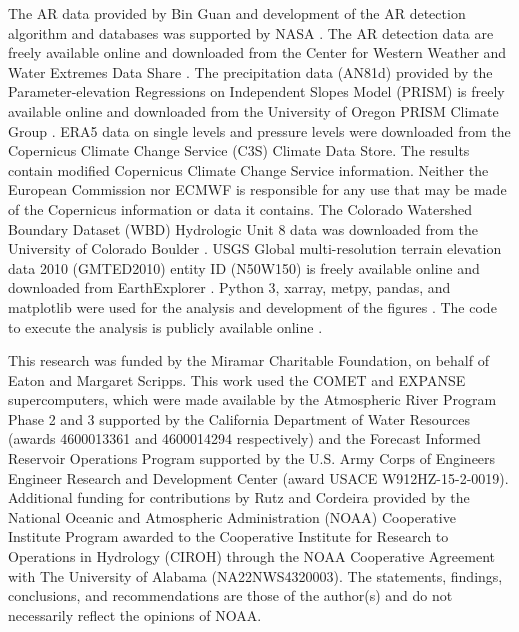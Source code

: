 \documentclass[draft]{agujournal2019}
\begin{document}
The AR data provided by Bin Guan and development of the AR detection algorithm and databases was supported by NASA \cite{Guan2022GlobalDataset}. The  AR detection data are freely available online and downloaded from the Center for Western Weather and Water Extremes Data Share \cite{Rutz2014RutzDataset}. The precipitation data (AN81d) provided by the Parameter-elevation Regressions on Independent Slopes Model (PRISM) is freely available online and downloaded from the University of Oregon PRISM Climate Group \cite{PRISMClimateGroup2004PRISMData}. ERA5 data on single levels \cite{Hersbach2018a} and pressure levels \cite{Hersbach2018} were downloaded from the Copernicus Climate Change Service (C3S) Climate Data Store. The results contain modified Copernicus Climate Change Service information. Neither the European Commission nor ECMWF is responsible for any use that may be made of the Copernicus information or data it contains. The Colorado Watershed Boundary Dataset (WBD) Hydrologic Unit 8 data was downloaded from the University of Colorado Boulder \cite{U.S.GeologicalSurvey2015ColoradoDataset}. USGS Global multi-resolution terrain elevation data 2010 (GMTED2010) entity ID (N50W150) is freely available online and downloaded from EarthExplorer \cite{Danielson2011GlobalDataset}. Python 3, xarray, metpy, pandas, and matplotlib were used for the analysis and development of the figures \cite{thomas_a_caswell_2022_6982547, 
 May2017, metpy, hoyer2017xarray, xarray_v2022.12.0, Hunter:2007, the_pandas_development_team_2022_7344967, VanRossum2009}. The code to execute the analysis is publicly available online \cite{Nash2025CO_top-decile_precipitation_ARs:Software}. 





\acknowledgments
This research was funded by the Miramar Charitable Foundation, on behalf of Eaton and Margaret Scripps. This work used the COMET and EXPANSE supercomputers, which were made available by the Atmospheric River Program Phase 2 and 3 supported by the California Department of Water Resources (awards 4600013361 and 4600014294 respectively) and the Forecast Informed Reservoir Operations Program supported by the U.S. Army Corps of Engineers Engineer Research and Development Center (award USACE W912HZ-15-2-0019). Additional funding for contributions by Rutz and Cordeira provided by the National Oceanic and Atmospheric Administration (NOAA) Cooperative Institute Program awarded to the Cooperative Institute for Research to Operations in Hydrology (CIROH) through the NOAA Cooperative Agreement with The University of Alabama (NA22NWS4320003). The statements, findings, conclusions, and recommendations are those of the author(s) and do not necessarily reflect the opinions of NOAA.
\end{document}

